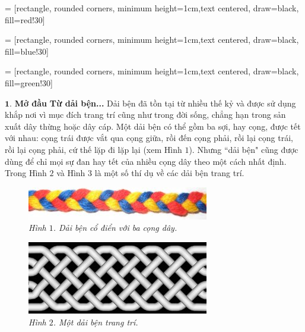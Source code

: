 \vspace*{150pt}

 = [rectangle, rounded corners, minimum height=1cm,text centered, draw=black, fill=red!30]

 = [rectangle, rounded corners, minimum height=1cm,text centered, draw=black, fill=blue!30]

 = [rectangle, rounded corners, minimum height=1cm,text centered, draw=black, fill=green!30]

\begin{multicols}{2}	
	$\pmb{1.}$ \textbf{\color{duongvaotoanhoc}Mở đầu}
	\vskip 0.1cm
	\textbf{\color{duongvaotoanhoc}Từ dải bện...}
	\vskip 0.1cm
	Dải bện đã tồn tại từ nhiều thế kỷ và được sử dụng khắp nơi vì mục đích trang trí cũng như trong đời sống, chẳng hạn trong sản xuất dây thừng hoặc dây cáp. Một dải bện có thể gồm ba sợi, hay cọng, được tết với nhau: cọng trái được vắt qua cọng giữa, rồi đến cọng phải, rồi lại cọng trái, rồi lại cọng phải, cứ thế lặp đi lặp lại (xem Hình $1$). Nhưng ``dải bện" cũng được dùng để chỉ mọi sự đan hay tết của nhiều cọng dây theo một cách nhất định. Trong Hình $2$ và Hình $3$ là một số thí dụ về các dải bện trang trí.
	\begin{figure}[H]
		\vspace*{-5pt}
		\centering
		\captionsetup{labelformat= empty, justification=centering}
		\includegraphics[width= 0.7\linewidth]{fig_01}
		\caption{\small\textit{\color{duongvaotoanhoc}Hình $1$. Dải bện cổ điển với ba cọng dây.}}
		\vspace*{-10pt}
	\end{figure}
	\begin{figure}[H]
		\vspace*{-10pt}
		\centering
		\captionsetup{labelformat= empty, justification=centering}
		\includegraphics[width= 0.7\linewidth]{fig_02}
		\caption{\small\textit{\color{duongvaotoanhoc}Hình $2$. Một dải bện trang trí.}}

\end{figure}
\end{multicols}
